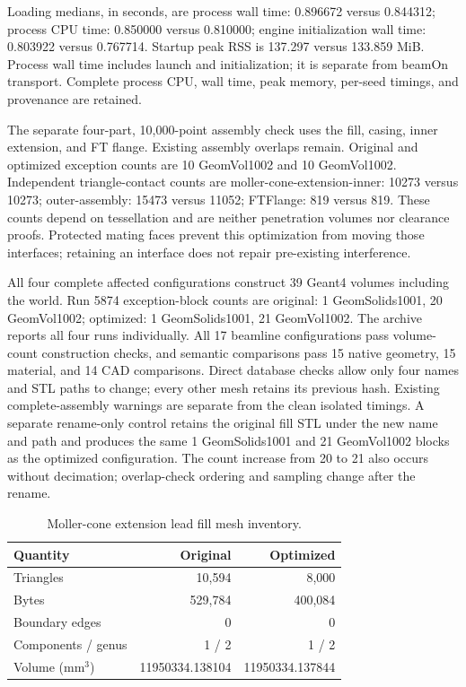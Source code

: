 Loading medians, in seconds, are process wall time: 0.896672 versus 0.844312; process CPU time: 0.850000
versus 0.810000; engine initialization wall time: 0.803922 versus 0.767714. Startup peak RSS is 137.297 versus
133.859 MiB. Process wall time includes launch and initialization; it is separate from beamOn transport.
Complete process CPU, wall time, peak memory, per-seed timings, and provenance are retained.

The separate four-part, 10,000-point assembly check uses the fill, casing, inner extension, and FT flange.
Existing assembly overlaps remain. Original and optimized exception counts are 10 GeomVol1002 and 10
GeomVol1002. Independent triangle-contact counts are moller-cone-extension-inner: 10273 versus 10273;
outer-assembly: 15473 versus 11052; FTFlange: 819 versus 819. These counts depend on tessellation and are
neither penetration volumes nor clearance proofs. Protected mating faces prevent this optimization from moving
those interfaces; retaining an interface does not repair pre-existing interference.

All four complete affected configurations construct 39 Geant4 volumes including the world. Run 5874
exception-block counts are original: 1 GeomSolids1001, 20 GeomVol1002; optimized: 1 GeomSolids1001, 21
GeomVol1002. The archive reports all four runs individually. All 17 beamline configurations pass volume-count
construction checks, and semantic comparisons pass 15 native geometry, 15 material, and 14 CAD comparisons.
Direct database checks allow only four names and STL paths to change; every other mesh retains its previous
hash. Existing complete-assembly warnings are separate from the clean isolated timings. A separate rename-only
control retains the original fill STL under the new name and path and produces the same 1 GeomSolids1001 and
21 GeomVol1002 blocks as the optimized configuration. The count increase from 20 to 21 also occurs without
decimation; overlap-check ordering and sampling change after the rename.

\begin{table}[htbp]
\centering
\caption{Moller-cone extension lead fill mesh inventory.}
\label{tab:extension_lead0}
\setlength{\tabcolsep}{5pt}
\begin{tabular}{lrr}
\toprule
Quantity & Original & Optimized \\
\midrule
Triangles & 10,594 & 8,000 \\
Bytes & 529,784 & 400,084 \\
Boundary edges & 0 & 0 \\
Components / genus & 1 / 2 & 1 / 2 \\
Volume (mm$^3$) & 11950334.138104 & 11950334.137844 \\
\bottomrule
\end{tabular}
\end{table}

